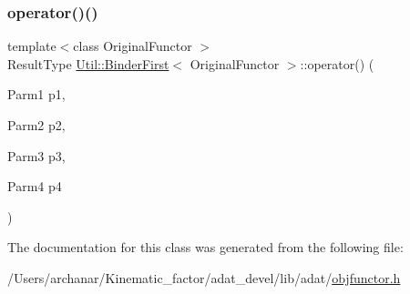 \subsubsection{\texorpdfstring{operator()()}{operator()()}\hspace{0.1cm}{\footnotesize\ttfamily [10/10]}}
{\footnotesize\ttfamily template$<$class Original\+Functor $>$ \\
Result\+Type \mbox{\hyperlink{classUtil_1_1BinderFirst}{Util\+::\+Binder\+First}}$<$ Original\+Functor $>$\+::operator() (\begin{DoxyParamCaption}\item[{Parm1}]{p1,  }\item[{Parm2}]{p2,  }\item[{Parm3}]{p3,  }\item[{Parm4}]{p4 }\end{DoxyParamCaption})\hspace{0.3cm}{\ttfamily [inline]}}



The documentation for this class was generated from the following file\+:\begin{DoxyCompactItemize}
\item 
/\+Users/archanar/\+Kinematic\+\_\+factor/adat\+\_\+devel/lib/adat/\mbox{\hyperlink{lib_2adat_2objfunctor_8h}{objfunctor.\+h}}\end{DoxyCompactItemize}
